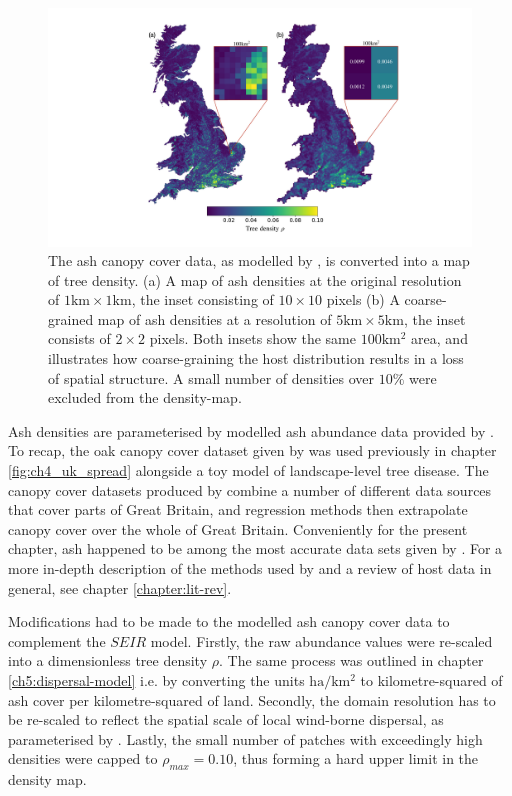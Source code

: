 \begin{figure}
    \centering
    \includegraphics[scale=0.45]{chapter6/figures/fig-ash-data.pdf}
    \caption{The ash canopy cover data, as modelled by \cite{hill.data}, is converted into a map of tree density. (a) A map of ash densities at the original resolution of $1\mathrm{km} \times 1\mathrm{km}$, the inset consisting of $10\times 10$ pixels (b) A coarse-grained map of ash densities at a resolution of $5\mathrm{km} \times 5\mathrm{km}$, the inset consists of $2 \times 2$ pixels. Both insets show the same $100\mathrm{km^2}$ area, and illustrates how coarse-graining the host distribution results in a loss of spatial structure. A small number of densities over $10\%$ were excluded from the density-map.}
    \label{fig:ash-host-data}
\end{figure}

Ash densities are parameterised by modelled ash abundance data provided by \cite{hill.data}. 
To recap, the oak canopy cover dataset given by \cite{hill.data} was used previously in chapter \ref{fig:ch4_uk_spread} alongside a toy model of landscape-level tree disease.
The canopy cover datasets produced by \cite{hill.data} combine a number of different data sources that cover parts of Great Britain,
and regression methods then extrapolate canopy cover over the whole of Great Britain.
Conveniently for the present chapter, ash happened to be among the most accurate data sets given by \cite{hill.data}. 
For a more in-depth description of the methods used by \cite{hill.data} and a review of host data in general, see chapter \ref{chapter:lit-rev}.

Modifications had to be made to the modelled ash canopy cover data to complement the $SEIR$ model. 
Firstly, the raw abundance values were re-scaled into a dimensionless tree density $\rho$. 
The same process was outlined in chapter \ref{ch5:dispersal-model} 
i.e. by converting the units $\mathrm{ha/km^2}$ to kilometre-squared of ash cover per kilometre-squared of land. Secondly, 
the domain resolution has to be re-scaled to reflect the spatial scale of local wind-borne dispersal, as parameterised by \cite{grosdidier2018tracking}.
Lastly, the small number of patches with exceedingly high densities were capped to $\rho_{max} = 0.10$, thus forming a hard upper limit in the density map.

